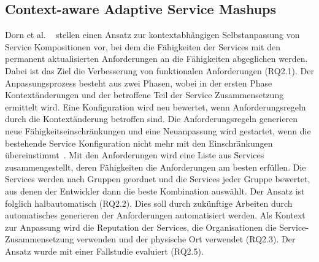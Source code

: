 \documentclass[conference,compsoc,ngerman]{IEEEtran}
\begin{document}
\subsection{Context-aware Adaptive Service Mashups}
Dorn et al. ~\cite{dorn2009context} stellen einen Ansatz zur kontextabhängigen Selbstanpassung von Service Kompositionen vor, bei dem die Fähigkeiten der Services mit den permanent aktualisierten Anforderungen an die Fähigkeiten abgeglichen werden. Dabei ist das Ziel die Verbesserung von funktionalen Anforderungen (RQ2.1). Der Anpassungsprozess besteht aus zwei Phasen, wobei in der ersten Phase Kontextänderungen und der betroffene Teil der Service Zusammensetzung ermittelt wird. Eine Konfiguration wird neu bewertet, wenn Anforderungsregeln durch die Kontextänderung betroffen sind. Die Anforderungsregeln generieren neue Fähigkeitseinschränkungen und eine Neuanpassung wird gestartet, wenn die bestehende Service Konfiguration nicht mehr mit den Einschränkungen übereinstimmt~\cite{dorn2009context}. Mit den Anforderungen wird eine Liste aus Services zusammengestellt, deren Fähigkeiten die Anforderungen am besten erfüllen. Die Services werden nach Gruppen geordnet und die Services jeder Gruppe bewertet, aus denen der Entwickler dann die beste Kombination auswählt. Der Ansatz ist folglich halbautomatisch (RQ2.2). Dies soll durch zukünftige Arbeiten durch automatisches generieren der Anforderungen automatisiert werden.
Als Kontext zur Anpassung wird die Reputation der Services, die Organisationen die Service-Zusammensetzung verwenden und der physische Ort verwendet (RQ2.3).
Der Ansatz wurde mit einer Fallstudie evaluiert (RQ2.5).
\end{document}
